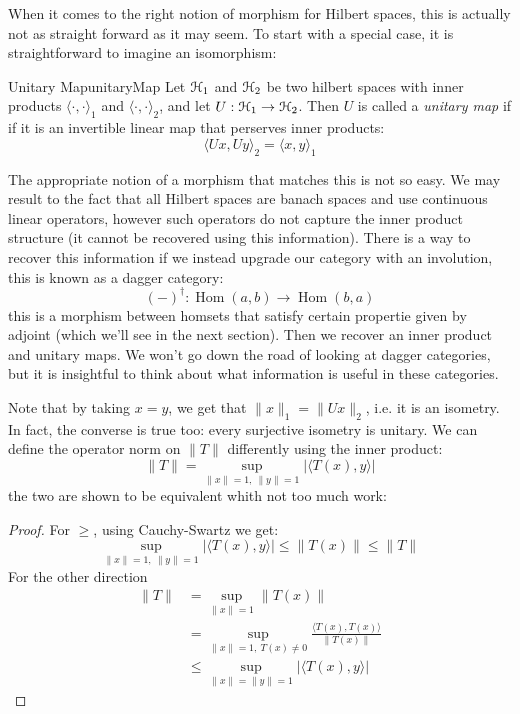 \documentclass[oneside]{book}
\newcommand{\EH}{\EuScript{H}}
\newcommand{\Hom}{\operatorname{Hom}}
\newcommand{\rw}{\rightarrow}
\begin{document}
When it comes to the right notion of morphism for Hilbert spaces, this is actually not as straight forward as it may
seem. To start with a special case, it is straightforward to imagine an isomorphism:

\begin{defn}{Unitary Map}{unitaryMap}
Let $\EH_1$ and $\EH_2$ be two hilbert spaces with inner products $\langle \cdot, \cdot \rangle_1$ and $\langle
\cdot, \cdot \rangle_2$, and let $U: \EH_1 \rw \EH_2$. Then $U$ is called a \emph{unitary map} if if it is an
invertible linear map that perserves inner products:
\[
	\langle Ux, Uy \rangle_2 = \langle x,y\rangle_1
\]
\end{defn}

The appropriate notion of a morphism that matches this is not so easy. We may result to the fact that all
Hilbert spaces are banach spaces and use continuous linear operators, however such operators do not capture the inner
product structure (it cannot be recovered using this information). There is a way to recover this information if we
instead upgrade our category with an involution, this is known as a dagger category:
\[
	(-)^\dagger: \Hom(a,b) \to \Hom(b,a)
\]
this is a morphism between homsets that satisfy certain propertie given by adjoint (which we'll see in the next
section). Then we recover an inner product and unitary maps. We won't go down the road of looking at dagger categories,
but it is insightful to think about what information is useful in these categories.

Note that by taking $x = y$, we get that $\|x\|_1 = \|Ux\|_2$, i.e. it is an isometry. In fact, the converse is true
too: every surjective isometry is unitary. We can define the operator norm on $\|T\|$ differently using the inner
product:
\[
	\|T\| = \sup_{\|x\| = 1,\ \|y\| = 1} |\langle T(x), y\rangle|
\]
the two are shown to be equivalent whith not too much work:
\begin{proof}
	For $\ge$, using Cauchy-Swartz we get:
	\[
		\sup_{\|x\| = 1,\ \|y\| = 1} |\langle T(x), y\rangle| \le \|T(x)\| \le \|T\|
	\]
	For the other direction
	\begin{align*}
		\|T\| &= \sup_{\|x\| = 1} \|T(x)\|\\
			  &= \sup_{\|x\| = 1,\ T(x) \ne 0} \frac{\langle T(x), T(x)\rangle}{\|T(x)\|}\\
			  &\le \sup_{\|x\| = \|y\| = 1} |\langle T(x), y\rangle|
	\end{align*}
\end{proof}
\end{document}
